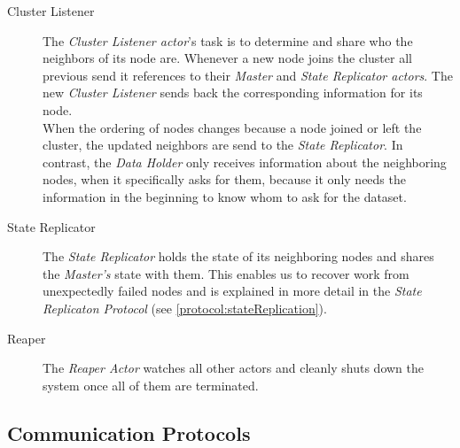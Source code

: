 \begin{description}
  \item[Cluster Listener]
  The \emph{Cluster Listener actor}'s task is to determine and share who the neighbors of its node are.
  Whenever a new node joins the cluster all previous send it references to their \emph{Master} and \emph{State Replicator actors}.
  The new \emph{Cluster Listener} sends back the corresponding information for its node. \\
  When the ordering of nodes changes because a node joined or left the cluster, the updated neighbors are send to the \emph{State Replicator}.
  In contrast, the \emph{Data Holder} only receives information about the neighboring nodes, when it specifically asks for them, because it only needs the information in the beginning to know whom to ask for the dataset.
  
  \item[State Replicator]
  The \emph{State Replicator} holds the state of its neighboring nodes and shares the \emph{Master's} state with them.
  This enables us to recover work from unexpectedly failed nodes and is explained in more detail in the \emph{State Replicaton Protocol} (see \cref{protocol:stateReplication}).
  
  \item[Reaper] 
  The \emph{Reaper Actor} watches all other actors and cleanly shuts down the system once all of them are terminated.
\end{description}

\subsection{Communication Protocols}

